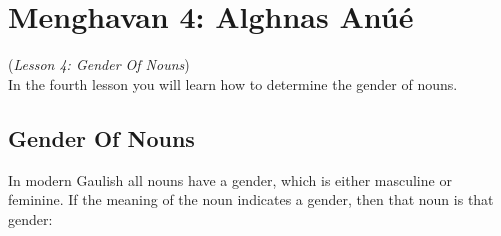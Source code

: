 \section{Menghavan 4: Alghnas An\'{u}\'{e}}
(\textit{Lesson 4: Gender Of Nouns})\\

In the fourth lesson you will learn how to determine the gender of nouns.

\subsection{Gender Of Nouns}

In modern Gaulish all nouns have a gender, which is either masculine or feminine. If the meaning of the noun indicates a gender, then that noun is that gender:

